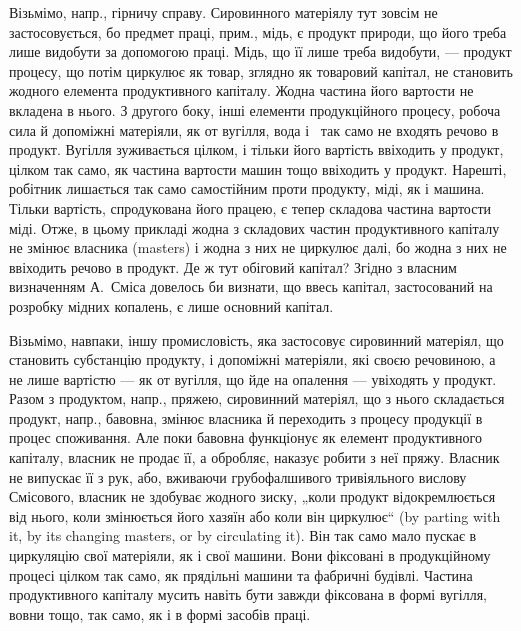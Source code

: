 Візьмімо, напр., гірничу справу. Сировинного матеріялу тут зовсім не
застосовується, бо предмет праці, прим., мідь, є продукт природи, що
його треба лише видобути за допомогою праці. Мідь, що її лише треба
видобути, — продукт процесу, що потім циркулює як товар, зглядно як
товаровий капітал, не становить жодного елемента продуктивного капіталу.
Жодна частина його вартости не вкладена в нього. З другого боку,
інші елементи продукційного процесу, робоча сила й допоміжні матеріяли,
як от вугілля, вода і~ так само не входять речово в продукт.
Вугілля зуживається цілком, і тільки його вартість ввіходить у продукт,
цілком так само, як частина вартости машин тощо ввіходить у продукт.
Нарешті, робітник лишається так само самостійним проти продукту, міді,
як і машина. Тільки вартість, спродукована його працею, є тепер складова
частина вартости міді. Отже, в цьому прикладі жодна з складових
частин продуктивного капіталу не змінює власника (masters) і жодна з
них не циркулює далі, бо жодна з них не ввіходить речово в продукт.
Де ж тут обіговий капітал? Згідно з власним визначенням А.~Сміса довелось
би визнати, що ввесь капітал, застосований на розробку мідних
копалень, є лише основний капітал.

Візьмімо, навпаки, іншу промисловість, яка застосовує сировинний
матеріял, що становить субстанцію продукту, і допоміжні матеріяли, які
своєю речовиною, а не лише вартістю — як от вугілля, що йде на опалення
— увіходять у продукт. Разом з продуктом, напр., пряжею, сировинний
матеріял, що з нього складається продукт, напр., бавовна, змінює
власника й переходить з процесу продукції в процес споживання. Але
поки бавовна функціонує як елемент продуктивного капіталу, власник не
продає її, а обробляє, наказує робити з неї пряжу. Власник не випускає
її з рук, або, вживаючи грубофалшивого тривіяльного вислову Смісового,
власник не здобуває жодного зиску, „коли продукт відокремлюється від
нього, коли змінюється його хазяїн або коли він циркулює“ (by parting
with it, by its changing masters, or by circulating it). Він так само мало
пускає в циркуляцію свої матеріяли, як і свої машини. Вони фіксовані
в продукційному процесі цілком так само, як прядільні машини та фабричні
будівлі. Частина продуктивного капіталу мусить навіть бути завжди
фіксована в формі вугілля, вовни тощо, так само, як і в формі засобів
праці.

